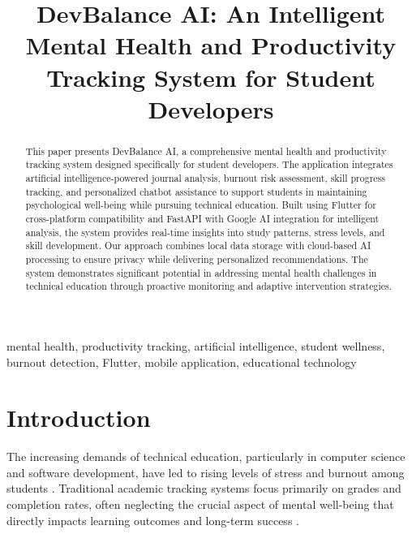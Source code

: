 \documentclass[conference,10pt]{IEEEtran}
\begin{document}
\title{DevBalance AI: An Intelligent Mental Health and Productivity Tracking System for Student Developers}

\author{
}

\maketitle

\begin{abstract}
This paper presents DevBalance AI, a comprehensive mental health and productivity tracking system designed specifically for student developers. The application integrates artificial intelligence-powered journal analysis, burnout risk assessment, skill progress tracking, and personalized chatbot assistance to support students in maintaining psychological well-being while pursuing technical education. Built using Flutter for cross-platform compatibility and FastAPI with Google AI integration for intelligent analysis, the system provides real-time insights into study patterns, stress levels, and skill development. Our approach combines local data storage with cloud-based AI processing to ensure privacy while delivering personalized recommendations. The system demonstrates significant potential in addressing mental health challenges in technical education through proactive monitoring and adaptive intervention strategies.
\end{abstract}

\begin{IEEEkeywords}
mental health, productivity tracking, artificial intelligence, student wellness, burnout detection, Flutter, mobile application, educational technology
\end{IEEEkeywords}

\section{Introduction}

The increasing demands of technical education, particularly in computer science and software development, have led to rising levels of stress and burnout among students \cite{smith2020}. Traditional academic tracking systems focus primarily on grades and completion rates, often neglecting the crucial aspect of mental well-being that directly impacts learning outcomes and long-term success \cite{johnson2019}. 
\end{document}
